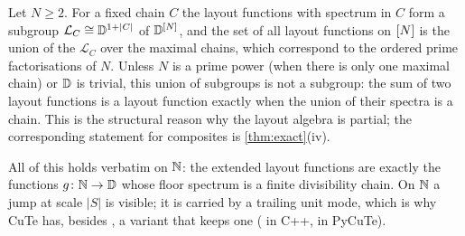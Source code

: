 \begin{remark}\label{rem:arrangement}
Let $N\ge2$. For a fixed chain $C$ the layout functions with spectrum in $C$ form a subgroup
$\mathcal L_C\cong\mathbb{D}^{1+|C|}$ of $\mathbb{D}^{[N]}$, and the set of all layout functions on $[N]$ is
the union of the $\mathcal L_C$ over the maximal chains, which correspond to the ordered prime
factorisations of $N$. Unless $N$ is a prime power (when there is only one maximal chain) or $\mathbb{D}$
is trivial, this union of subgroups is not a subgroup: the sum of two layout functions is a
layout function exactly when the union of their spectra is a chain. This is the structural reason
why the layout algebra is partial; the corresponding statement for composites is
\cref{thm:exact}(iv).
\end{remark}

\begin{remark}\label{rem:extended}
All of this holds verbatim on $\mathbb{N}$: the extended layout functions are exactly the functions
$g\colon\mathbb{N}\to\mathbb{D}$ whose floor spectrum is a finite divisibility chain. On $\mathbb{N}$ a jump at scale
$|S|$ is visible; it is carried by a trailing unit mode, which is why CuTe has, besides
, a variant that keeps one ( in C++,  in
PyCuTe).
\end{remark}
